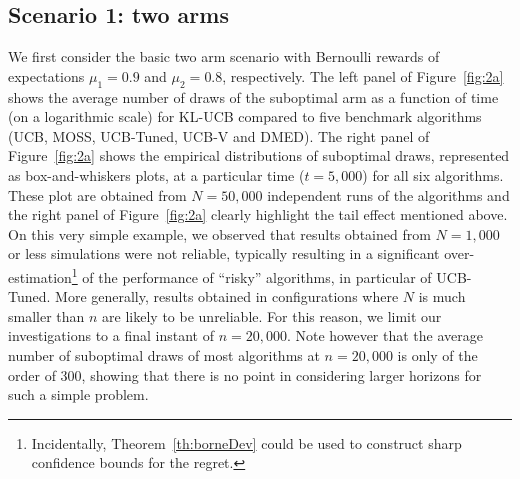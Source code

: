 \documentclass[wcp]{jmlr}
\newcommand{\1}{\mathbbm{1}}
\begin{document}
{\subsection{Scenario 1: two arms}
We first consider the basic two arm scenario with Bernoulli rewards of
expectations $\mu_1=0.9$ and $\mu_2=0.8$, respectively. The left panel of
Figure~\ref{fig:2a} shows the average number of draws of the suboptimal arm as
a function of time (on a logarithmic scale) for KL-UCB compared to five
benchmark algorithms (UCB, MOSS, UCB-Tuned, UCB-V and DMED). The right panel of
Figure~\ref{fig:2a} shows the empirical distributions of suboptimal draws,
represented as box-and-whiskers plots, at a particular time ($t=5,000$) for
all six algorithms. These plot are obtained from $N=50,000$ independent runs of
the algorithms and the right panel of Figure~\ref{fig:2a} clearly highlight
the tail effect mentioned above. On this very simple example, we observed that
results obtained from $N=1,000$ or less simulations were not reliable,
typically resulting in a significant over-estimation\footnote{Incidentally, Theorem~\ref{th:borneDev} could be used to construct sharp confidence bounds for the regret.} of the performance of
``risky'' algorithms, in particular of UCB-Tuned. More generally, results
obtained in configurations where $N$ is much smaller than $n$ are likely to be
unreliable. For this reason, we limit our investigations to a final instant of
$n=20,000$. Note however that the average number of suboptimal draws of most
algorithms at $n=20,000$ is only of the order of $300$, showing that there is no
point in considering larger horizons for such a simple problem.

}
\end{document}
